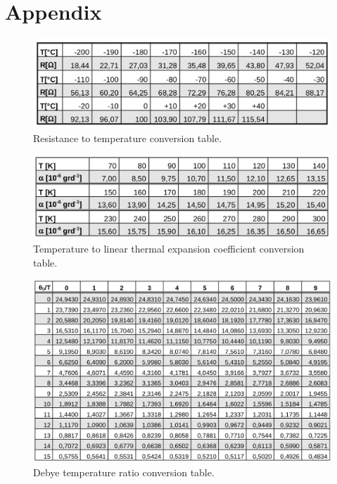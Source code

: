 \section*{Appendix}


\null\vfill

\begin{figure}[H]
	\centering
	\includegraphics[width=0.6\linewidth]{content/graphics/resistance.jpg}
	\caption{Resistance to temperature conversion table. \cite{molar_heat}}
	\label{fig:resistance}
\end{figure}

\begin{figure}[H]
	\centering
	\includegraphics[width=0.6\linewidth]{content/graphics/expansion.jpg}
	\caption{Temperature to linear thermal expansion coefficient conversion table. \cite{molar_heat}}
	\label{fig:expansion}
\end{figure}

\begin{figure}[H]
	\centering
	\includegraphics[width=0.8\linewidth]{content/graphics/ratio.jpg}
	\caption{Debye temperature ratio conversion table. \cite{molar_heat}}
	\label{fig:ratio}
\end{figure}

\vfill\null\newpage\null\vfill

